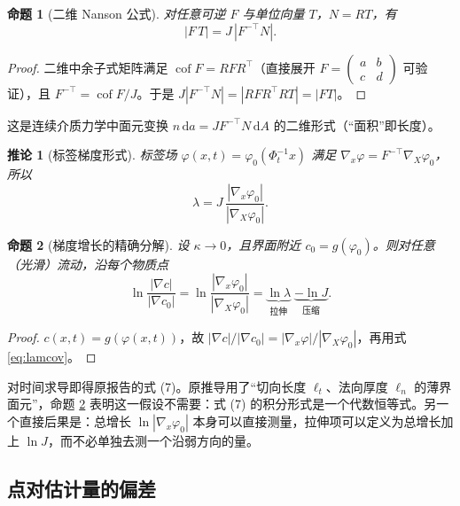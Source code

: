 \documentclass[10.5pt,a4paper]{article}
\theoremstyle{plain}
\newtheorem{prop}{命题}\newtheorem{coro}{推论}\newtheorem{defi}{定义}
\newcommand{\dd}{\mathrm{d}}
\begin{document}
\begin{prop}[二维 Nanson 公式]\label{prop:nanson}
对任意可逆 $F$ 与单位向量 $T$，$N=RT$，有
\begin{equation}
|F\,T| = J\,|F^{-\top}N| .\label{eq:nanson}
\end{equation}
\end{prop}
\begin{proof}
二维中余子式矩阵满足 $\operatorname{cof}F=RFR^\top$（直接展开 $F=\begin{pmatrix}a&b\\c&d\end{pmatrix}$ 可验证），且 $F^{-\top}=\operatorname{cof}F/J$。于是 $J|F^{-\top}N|=|RFR^\top RT|=|FT|$。
\end{proof}
这是连续介质力学中面元变换 $n\,\dd a=J F^{-\top}N\,\dd A$ 的二维形式（“面积”即长度）。

\begin{coro}[标签梯度形式]\label{coro:label}
标签场 $\varphi(x,t)=\varphi_0(\Phi_t^{-1}x)$ 满足 $\nabla_x\varphi=F^{-\top}\nabla_X\varphi_0$，所以
\begin{equation}
\lambda = J\,\frac{|\nabla_x\varphi_0|}{|\nabla_X\varphi_0|}. \label{eq:lamcov}
\end{equation}
\end{coro}

\begin{prop}[梯度增长的精确分解]\label{prop:split}
设 $\kappa\to0$，且界面附近 $c_0=g(\varphi_0)$。则对任意（光滑）流动，沿每个物质点
\begin{equation}
\ln\frac{|\nabla c|}{|\nabla c_0|}=\ln\frac{|\nabla_x\varphi_0|}{|\nabla_X\varphi_0|}=\underbrace{\ln\lambda}_{\text{拉伸}}\;\underbrace{-\ln J}_{\text{压缩}} .\label{eq:split}
\end{equation}
\end{prop}
\begin{proof}
$c(x,t)=g(\varphi(x,t))$，故 $|\nabla c|/|\nabla c_0|=|\nabla_x\varphi|/|\nabla_X\varphi_0|$，再用式 \eqref{eq:lamcov}。
\end{proof}
对时间求导即得原报告的式 (7)。原推导用了“切向长度 $\ell_t$、法向厚度 $\ell_n$ 的薄界面元”，命题 \ref{prop:split} 表明这一假设不需要：式 (7) 的积分形式是一个代数恒等式。另一个直接后果是：总增长 $\ln|\nabla_x\varphi_0|$ 本身可以直接测量，拉伸项可以定义为总增长加上 $\ln J$，而不必单独去测一个沿弱方向的量。

\subsection{点对估计量的偏差}
\end{document}
